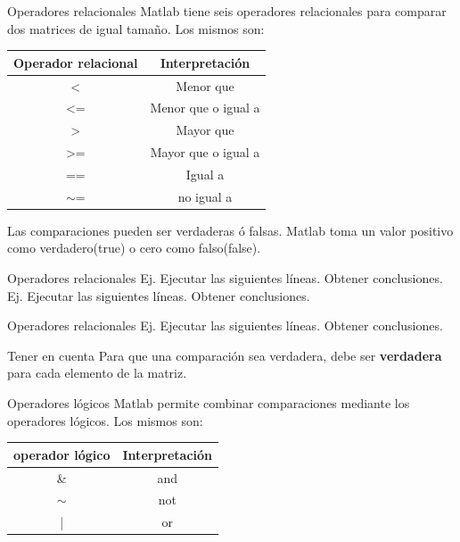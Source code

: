 \documentclass{bredelebeamer}
\begin{document}
\begin{frame}{Operadores relacionales}
Matlab tiene seis operadores relacionales para comparar dos matrices de igual tamaño. Los mismos son:\\
\begin{table}[]
\centering
\begin{tabular}{|c|c|}
\hline
Operador relacional & Interpretación      \\ \hline
\textless{}         & Menor que           \\ \hline
\textless{}=        & Menor que o igual a \\ \hline
\textgreater{}      & Mayor que           \\ \hline
\textgreater{}=     & Mayor que o igual a \\ \hline
==                  & Igual a             \\ \hline
$\sim$=             & no igual a          \\ \hline
\end{tabular}
\end{table}
Las comparaciones pueden ser verdaderas ó falsas. Matlab toma un valor positivo como verdadero(true) o cero como falso(false).
\end{frame}

\begin{frame}{Operadores relacionales}
Ej. Ejecutar las siguientes líneas. Obtener conclusiones.
Ej. Ejecutar las siguientes líneas. Obtener conclusiones.
\end{frame}

\begin{frame}{Operadores relacionales}
Ej. Ejecutar las siguientes líneas. Obtener conclusiones.
\begin{alertblock}{Tener en cuenta}
Para que una comparación sea verdadera, debe ser \textbf{verdadera} para cada elemento de la matriz.
\end{alertblock}
\end{frame}

\begin{frame}{Operadores lógicos}
Matlab permite combinar comparaciones mediante los operadores lógicos. Los mismos son:
\begin{table}[]
\centering
\begin{tabular}{|c|c|}
\hline
operador lógico & Interpretación \\ \hline
\&              & and            \\ \hline
$\sim$          & not            \\ \hline
|               & or             \\ \hline
\end{tabular}
\end{table}
\end{frame}
\end{document}
